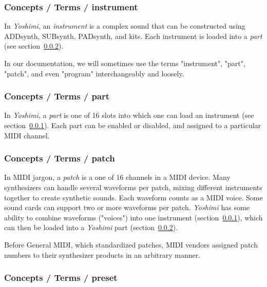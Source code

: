 \subsubsection{Concepts / Terms / instrument}
\label{subsubsec:concepts_terms_instrument}

   In \textsl{Yoshimi}, an \textsl{instrument} is a complex sound that can
   be constructed using ADDsynth, SUBsynth, PADsynth, and kits.
   Each instrument is loaded into a \textsl{part}
   (see section~\ref{subsubsec:concepts_terms_part}).

   In our documentation, we will sometimes use the terms "instrument",
   "part", "patch", and even "program" interchangeably and loosely.

\subsubsection{Concepts / Terms / part}
\label{subsubsec:concepts_terms_part}

   In \textsl{Yoshimi}, a \textsl{part} is one of 16 slots into which one
   can load an
   instrument (see section~\ref{subsubsec:concepts_terms_instrument}).
   Each part can be enabled
   or disabled, and assigned to a particular MIDI channel.

\subsubsection{Concepts / Terms / patch}
\label{subsubsec:concepts_terms_patch}

   In MIDI jargon, a \textsl{patch} is a
   one of 16 channels in a MIDI device. Many synthesizers
   can handle several waveforms per patch, mixing different
   instruments together to create synthetic sounds. Each waveform counts as
   a MIDI voice. Some sound cards can support two or more waveforms per
   patch.  \textsl{Yoshimi} has some ability to combine waveforms ("voices")
   into one instrument (section~\ref{subsubsec:concepts_terms_instrument}),
   which can then be loaded into a
   \textsl{Yoshimi} part (section~\ref{subsubsec:concepts_terms_part}).

   Before General MIDI, which standardized patches, MIDI vendors assigned
   patch numbers to their synthesizer products in an arbitrary manner.

\subsubsection{Concepts / Terms / preset}
\label{subsubsec:concepts_terms_program}

